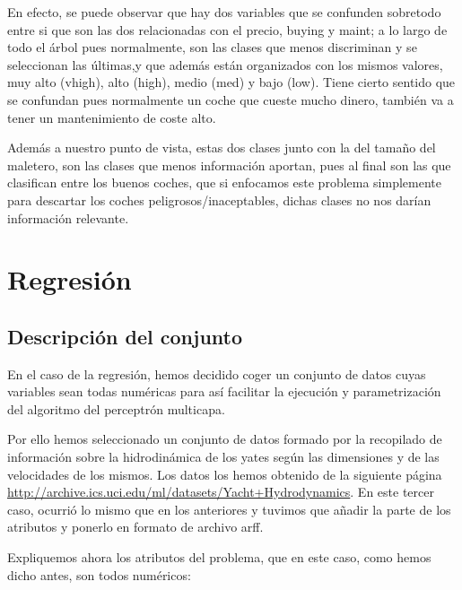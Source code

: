 \documentclass[a4paper, 11pt, twoside, openany, onecolumn, final]{memoir}
\begin{document}
	En efecto, se puede observar que hay dos variables que se confunden sobretodo entre si que son las dos relacionadas con el precio, buying y maint; a lo largo de todo el árbol pues normalmente, son las clases que menos discriminan y se seleccionan las últimas,y que además están organizados con los mismos valores, muy alto (vhigh), alto (high), medio (med) y bajo (low). Tiene cierto sentido que se confundan pues normalmente un coche que cueste mucho dinero, también va a tener un mantenimiento de coste alto. 
	
	Además a nuestro punto de vista, estas dos clases junto con la del tamaño del maletero, son las clases que menos información aportan, pues al final son las que clasifican entre los buenos coches, que si enfocamos este problema simplemente para descartar los coches peligrosos/inaceptables, dichas clases no nos darían información relevante.
	
\chapter{Regresión}
	\section{Descripción del conjunto}
	En el caso de la regresión, hemos decidido coger un conjunto de datos cuyas variables sean todas numéricas para así facilitar la ejecución y parametrización del algoritmo del perceptrón multicapa. 
	
	Por ello hemos seleccionado un conjunto de datos formado por la recopilado de información sobre la hidrodinámica de los yates según las dimensiones y de las velocidades de los mismos. 
	Los datos los hemos obtenido de la siguiente página \url{http://archive.ics.uci.edu/ml/datasets/Yacht+Hydrodynamics}.
	En este tercer caso, ocurrió lo mismo que en los anteriores y tuvimos que añadir la parte de los atributos y ponerlo en formato de archivo arff.
	
	Expliquemos ahora los atributos del problema, que en este caso, como hemos dicho antes, son todos numéricos:
	
\end{document}
